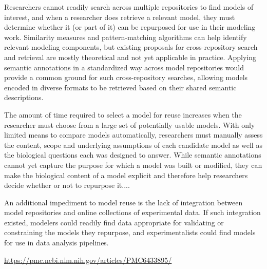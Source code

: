 \documentclass[11pt]{article}
\begin{document}
\begin{blockQuote}

Researchers cannot readily search across multiple repositories to find models of interest, and when a researcher does retrieve a relevant model, they must determine whether it (or part of it) can be repurposed for use in their modeling work. Similarity measures and pattern-matching algorithms can help identify relevant modeling components, but existing proposals for cross-repository search and retrieval are mostly theoretical and not yet applicable in practice. Applying semantic annotations in a standardized way across model repositories would provide a common ground for such cross-repository searches, allowing models encoded in diverse formats to be retrieved based on their shared semantic descriptions. 

\pseudoIndent{} The amount of time required to select a model for reuse increases when the researcher must choose from a large set of potentially usable models. With only limited means to compare models automatically, researchers must manually assess the content, scope and underlying assumptions of each candidate model as well as the biological questions each was designed to answer. While semantic annotations cannot yet capture the purpose for which a model was built or modified, they can make the biological content of a model explicit and therefore help researchers decide whether or not to repurpose it....

\pseudoIndent{} An additional impediment to model reuse is the lack of integration between model repositories and online collections of experimental data. If such integration existed, modelers could readily find data appropriate for validating or constraining the models they repurpose, and experimentalists could find models for use in data analysis pipelines. 
\end{blockQuote}

\vspace*{5pt}
\hfill{}

\hfill\href{https://pmc.ncbi.nlm.nih.gov/articles/PMC6433895/}{https://pmc.ncbi.nlm.nih.gov/articles/PMC6433895/}


\vspace*{6pt}
\end{document}

